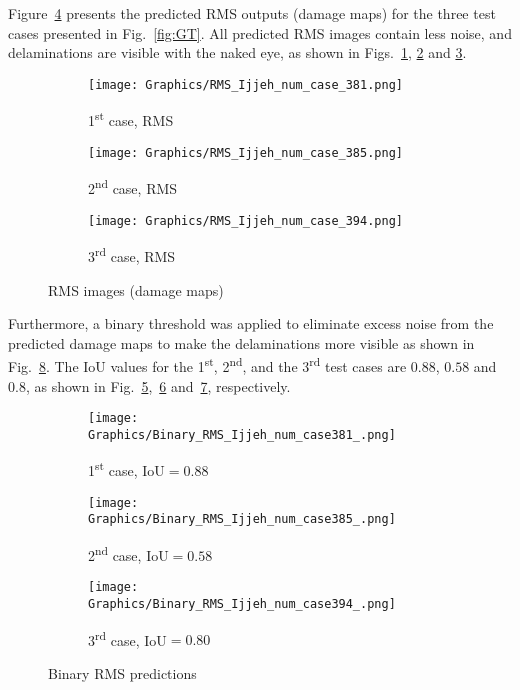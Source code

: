 \documentclass{IOS-Book-Article}
\begin{document}
Figure~\ref{fig:num_cases} presents the predicted RMS outputs (damage maps) for the three test cases presented in Fig.~\ref{fig:GT}.
All predicted RMS images contain less noise, and delaminations are visible with the naked eye, as shown in Figs.~\ref{fig:num_1st_case}, \ref{fig:num_2nd_case} and \ref{fig:num_3rd_case}.
\begin{figure}[ht!]
	\centering
	\begin{subfigure}[b]{0.32\textwidth}
		\centering
		\texttt{[image: Graphics/RMS\_Ijjeh\_num\_case\_381.png]}
		\caption{1\textsuperscript{st} case, RMS}
		\label{fig:num_1st_case}
	\end{subfigure}
	\hfill
	\begin{subfigure}[b]{0.32\textwidth}
		\centering
		\texttt{[image: Graphics/RMS\_Ijjeh\_num\_case\_385.png]}
		\caption{2\textsuperscript{nd} case, RMS}
		\label{fig:num_2nd_case}
	\end{subfigure}
	\hfill
	\begin{subfigure}[b]{0.32\textwidth}
		\centering
		\texttt{[image: Graphics/RMS\_Ijjeh\_num\_case\_394.png]}
		\caption{3\textsuperscript{rd} case, RMS}
		\label{fig:num_3rd_case}
	\end{subfigure}
	\caption{RMS images (damage maps)}
	\label{fig:num_cases}
\end{figure}

Furthermore, a binary threshold was applied to eliminate excess noise from the predicted damage maps to make the delaminations more visible as shown in Fig.~\ref{fig:RMS_num_cases}.
The IoU values for the 1\textsuperscript{st}, 2\textsuperscript{nd}, and the 3\textsuperscript{rd} test cases are $0.88$, $0.58$ and $0.8$, as shown in Fig.~\ref{fig:Binary_RMS_381},~\ref{fig:Binary_RMS_385} and~\ref{fig:Binary_RMS_394}, respectively.
\begin{figure}
	\begin{subfigure}[b]{0.32\textwidth}
		\centering
		\texttt{[image: Graphics/Binary\_RMS\_Ijjeh\_num\_case381\_.png]}
		\caption{1\textsuperscript{st} case, IoU\(=0.88\)}
		\label{fig:Binary_RMS_381}
	\end{subfigure}
	\hfill	
	\begin{subfigure}[b]{0.32\textwidth}
		\centering
		\texttt{[image: Graphics/Binary\_RMS\_Ijjeh\_num\_case385\_.png]}
		\caption{2\textsuperscript{nd} case, IoU\(=0.58\)}
		\label{fig:Binary_RMS_385}
	\end{subfigure}
	\hfill
	\begin{subfigure}[b]{0.32\textwidth}
		\centering
		\texttt{[image: Graphics/Binary\_RMS\_Ijjeh\_num\_case394\_.png]}
		\caption{3\textsuperscript{rd} case, IoU\(=0.80\)}
		\label{fig:Binary_RMS_394}
	\end{subfigure}
	\caption{Binary RMS predictions}
	\label{fig:RMS_num_cases}
\end{figure}
\end{document}
